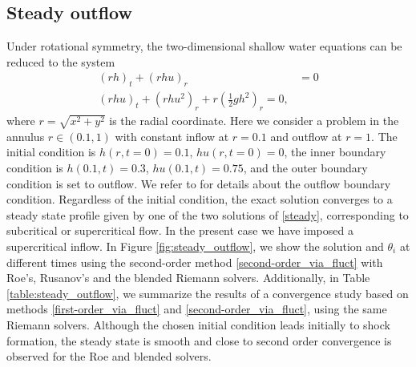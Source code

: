 \documentclass[preprint, 11pt]{article}
\begin{document}
\subsection{Steady outflow}\label{sec:steady_outflow}
Under rotational symmetry, the two-dimensional shallow water equations
can be reduced to the system
\begin{subequations} \label{eq:rsw}
\begin{align}
    (rh)_t + (rhu)_r & = 0 \label{mass1} \\
    (rhu)_t + (rhu^2)_r + r \left(\frac{1}{2}gh^2\right)_r = 0, \label{mom1}
\end{align}
\end{subequations}
where $r=\sqrt{x^2+y^2}$ is the radial coordinate.  Here we consider a problem
in the annulus $r\in(0.1,1)$ with constant inflow at $r=0.1$ and outflow at $r=1$.
The initial condition is
$h(r,t=0)=0.1$, $hu(r,t=0)=0$, the inner boundary condition is $h(0.1,t)=0.3$, $hu(0.1,t)=0.75$,
and the outer boundary condition is set to outflow.
We refer to \cite[\S 21.8.5]{leveque2002finite} for details about the outflow boundary condition.
Regardless of the initial condition, the exact solution converges to a
steady state profile given by one of the two solutions of \eqref{steady},
corresponding to subcritical or supercritical flow.  In the present case we
have imposed a supercritical inflow.
In Figure \ref{fig:steady_outflow}, we show the solution and $\theta_i$ at different times using
the second-order method \eqref{second-order_via_fluct}
with Roe's, Rusanov's and the blended Riemann solvers.  
Additionally, in Table \ref{table:steady_outflow}, we summarize the results of a convergence study
based on methods \eqref{first-order_via_fluct} and
\eqref{second-order_via_fluct}, using the same Riemann solvers.
Although the chosen initial
condition leads initially to shock formation, the steady state is smooth and close to
second order convergence is observed for the Roe and blended solvers.
\end{document}
